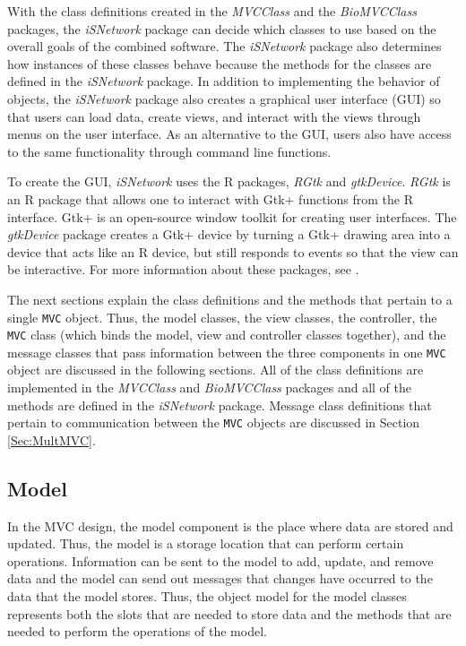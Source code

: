 \documentclass{article}[11pt]
\newcommand{\Robject}[1]{{\texttt{#1}}}
\newcommand{\Rpackage}[1]{{\textit{#1}}}
\newcommand{\Rclass}[1]{\texttt{#1}}
\begin{document}
With the class definitions created in the \Rpackage{MVCClass} and the
\Rpackage{BioMVCClass} packages, the
\Rpackage{iSNetwork} package can decide which classes
to use based on the overall goals of the combined software.  The
\Rpackage{iSNetwork} package also determines how instances of these classes
behave because the methods for the classes are defined in the
\Rpackage{iSNetwork} package.  In addition to implementing the behavior of
objects, the \Rpackage{iSNetwork} package also creates a graphical user
interface (GUI) so that users can load data, create views, and interact with
the views through menus on the user interface.  As an alternative to the GUI,
users also have access to the same functionality through command line
functions.  

To create the GUI, \Rpackage{iSNetwork} uses the R packages,
\Rpackage{RGtk} and \Rpackage{gtkDevice}.  \Rpackage{RGtk} is an \textsf{R}
package that allows one to interact with Gtk+ functions from the \textsf{R}
interface.  Gtk+ is an open-source window toolkit \cite{Gtk} for creating user
interfaces.  The \Rpackage{gtkDevice} package creates a Gtk+ device by turning
a Gtk+ drawing area into a device that acts like an \textsf{R} device, but
still responds to events so that the view can be interactive.  For more
information about these packages, see \cite{EW05}.  

The next sections explain the class definitions and the methods that
pertain to a single \Robject{MVC} object.  Thus, the model classes,
the view classes, the controller, the \Rclass{MVC} class
(which binds the model, view and controller classes
together), and the message classes that pass information between the
three components in one \Robject{MVC} object are discussed in the following
sections.  All of the class definitions are implemented in the
\Rpackage{MVCClass} and \Rpackage{BioMVCClass} packages and all of the methods
are defined in the \Rpackage{iSNetwork} package.  Message class definitions
that pertain to communication between the \Robject{MVC} objects are discussed
in Section \ref{Sec:MultMVC}. 

\subsection{Model}
\label{Ssec:OneModel}

In the MVC design, the model component is the place where data are stored and
updated.  Thus, the model is a storage location that can perform certain
operations.  Information can be sent to the model to add, update, and remove
data and the model can send out messages that changes have occurred to the
data that the model stores.  Thus, the object model for the model
classes represents both the slots that are needed to store data and the
methods that are needed to perform the operations of the model. 
\end{document}
